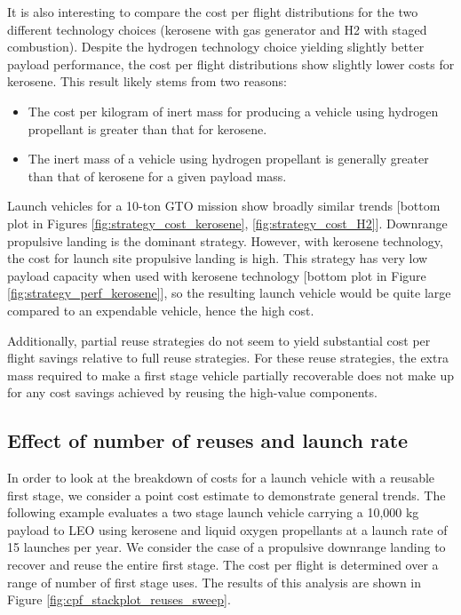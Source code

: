 \documentclass[conf]{new-aiaa}
\begin{document}
\begin{multicols}{2}
It is also interesting to compare the cost per flight distributions for the two different technology choices (kerosene with gas generator and H2 with staged combustion). Despite the hydrogen technology choice yielding slightly better payload performance, the cost per flight distributions show slightly lower costs for kerosene. This result likely stems from two reasons:

\begin{itemize}
  \item The cost per kilogram of inert mass for producing a vehicle using hydrogen propellant is greater than that for kerosene. 
  \item The inert mass of a vehicle using hydrogen propellant is generally greater than that of kerosene for a given payload mass.
\end{itemize}

Launch vehicles for a 10-ton GTO mission show broadly similar trends [bottom plot in Figures \ref{fig:strategy_cost_kerosene}, \ref{fig:strategy_cost_H2}]. Downrange propulsive landing is the dominant strategy. However, with kerosene technology, the cost for launch site propulsive landing is high. This strategy has very low payload capacity when used with kerosene technology [bottom plot in Figure \ref{fig:strategy_perf_kerosene}], so the resulting launch vehicle would be quite large compared to an expendable vehicle, hence the high cost.

Additionally, partial reuse strategies do not seem to yield substantial cost per flight savings relative to full reuse strategies. For these reuse strategies, the extra mass required to make a first stage vehicle partially recoverable does not make up for any cost savings achieved by reusing the high-value components. 


\subsection{Effect of number of reuses and launch rate}
In order to look at the breakdown of costs for a launch vehicle with a reusable first stage, we consider a point cost estimate to demonstrate general trends. The following example evaluates a two stage launch vehicle carrying a 10,000 kg payload to LEO using kerosene and liquid oxygen propellants at a launch rate of 15 launches per year. We consider the case of a propulsive downrange landing to recover and reuse the entire first stage. The cost per flight is determined over a range of number of first stage uses. The results of this analysis are shown in Figure \ref{fig:cpf_stackplot_reuses_sweep}.



\end{multicols}
\end{document}
